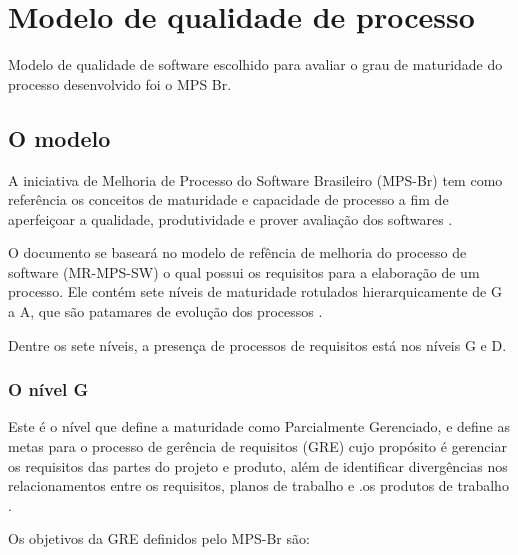 \section{Modelo de qualidade de processo}

Modelo de qualidade de software escolhido para avaliar o grau de maturidade do processo desenvolvido foi o MPS Br.

\subsection{O modelo}

A iniciativa de Melhoria de Processo do Software Brasileiro (MPS-Br) tem como referência os conceitos de maturidade e capacidade de processo a fim de aperfeiçoar a qualidade, produtividade e prover avaliação dos softwares \cite{mpsbr}.

O documento se baseará no modelo de refência de melhoria do processo de software (MR-MPS-SW) o qual possui os requisitos para a elaboração de um processo. Ele contém sete níveis de maturidade rotulados hierarquicamente de G a A, que são patamares de evolução dos processos \cite{mpsbr}.

Dentre os sete níveis, a presença de processos de requisitos está nos níveis G e D.
\subsubsection{O nível G}

Este é o nível que define a maturidade como Parcialmente Gerenciado, e define as metas para o processo de gerência de requisitos (GRE) cujo propósito é gerenciar os requisitos das partes do projeto e produto, além de identificar divergências nos relacionamentos entre os requisitos, planos de trabalho e .os produtos de trabalho \cite{mpsbr}.

Os objetivos da GRE definidos pelo MPS-Br são:


